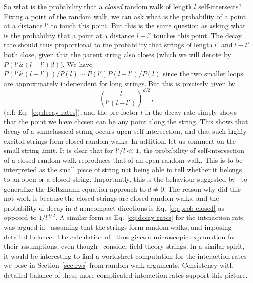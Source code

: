 \documentclass[a4paper,11pt]{article}
\newcommand{\lr}[1]{\left(#1\right)}
\begin{document}
So what is the probability that a \textit{closed} random walk of length $l$ self-intersects?
Fixing a point of the random walk, we can ask what is the probability of a point at a distance $l'$ to touch this point.
But this is the same question as asking what is the probability that a point at a distance $l-l'$ touches this point.
The decay rate should thus
proportional to the probability that strings of length 
$l'$ and $l-l'$ both close, given that the parent string also closes (which we will denote by $P(l'\& (l-l')|l)$).
We have $P(l'\& (l-l'))/P(l)\sim P(l')P(l-l')/P(l)$ since the
two smaller loops are approximately independent for long strings. 
But this is precisely given by
\begin{equation}\label{eq:prob-closed}
    \lr{\frac{l}{l'(l-l')}}^{d/2}\, ,
\end{equation}
(c.f: Eq.~\eqref{eq:decay-rates}), and the pre-factor $l$ in the decay rate simply shows that the point we have chosen can be any point along the string.
This shows that decay of a semiclassical string occurs upon self-intersection, and that such highly excited strings form closed random walks.
In addition, let us comment on the small string limit. 
It is clear that for $l'/l\ll 1$, the probability of self-intersection of a closed random walk reproduces that of an open random walk. 
This is to be interpreted as the small piece of string not being able to tell whether it belongs to an open or a closed string.
Importantly, this is the behaviour suggested by~\cite{Lowe:1994nm,Lee:1997iz} to generalize the Boltzmann equation approach to $d\neq 0$.
The reason why did this not work is because the closed strings are closed random walks, and the probability of decay in $d$-noncompact directions is Eq.~\eqref{eq:prob-closed} as opposed to $1/l^{d/2}$.
A similar form as Eq.~\eqref{eq:decay-rates} for the interaction rate was argued in~\cite{Copeland:1998na} assuming that the strings form random walks, and imposing detailed balance.
The calculation of~\cite{Manes:2001cs} thus gives a microscopic explanation for their assumptions, even though~\cite{Copeland:1998na} consider field theory strings.
In a similar spirit, it would be interesting to find a worldsheet computation for the interaction rates we pose in Section~\ref{sec:rws} from random walk arguments.
Consistency with detailed balance of these more complicated interaction rates support this picture.
\\
\end{document}
